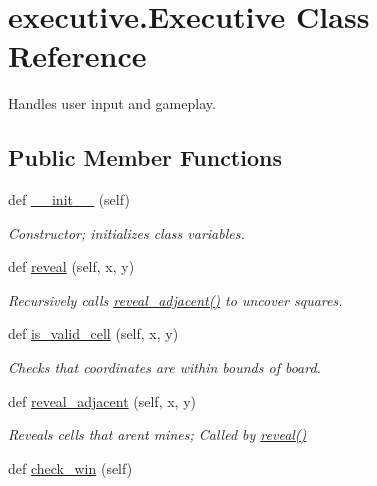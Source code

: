 \hypertarget{classexecutive_1_1_executive}{}\section{executive.\+Executive Class Reference}
\label{classexecutive_1_1_executive}


Handles user input and gameplay.  


\subsection*{Public Member Functions}
\begin{DoxyCompactItemize}
\item 
def \mbox{\hyperlink{classexecutive_1_1_executive_ac80ddb6446f931e0c83db8c38d55bd6f}{\+\_\+\+\_\+init\+\_\+\+\_\+}} (self)
\begin{DoxyCompactList}\small\item\em Constructor; initializes class variables. \end{DoxyCompactList}\item 
def \mbox{\hyperlink{classexecutive_1_1_executive_a6c8b73fd28d41e64cbd8b259d3c92ae8}{reveal}} (self, x, y)
\begin{DoxyCompactList}\small\item\em Recursively calls \mbox{\hyperlink{classexecutive_1_1_executive_a9d0ec27d177df404e872ffe9c2faf4ba}{reveal\+\_\+adjacent()}} to uncover squares. \end{DoxyCompactList}\item 
def \mbox{\hyperlink{classexecutive_1_1_executive_aa44d8e9965ea2e73d9e22c81208b8819}{is\+\_\+valid\+\_\+cell}} (self, x, y)
\begin{DoxyCompactList}\small\item\em Checks that coordinates are within bounds of board. \end{DoxyCompactList}\item 
def \mbox{\hyperlink{classexecutive_1_1_executive_a9d0ec27d177df404e872ffe9c2faf4ba}{reveal\+\_\+adjacent}} (self, x, y)
\begin{DoxyCompactList}\small\item\em Reveals cells that aren\textquotesingle{}t mines; Called by \mbox{\hyperlink{classexecutive_1_1_executive_a6c8b73fd28d41e64cbd8b259d3c92ae8}{reveal()}} \end{DoxyCompactList}\item 
def \mbox{\hyperlink{classexecutive_1_1_executive_a79dbdc41718e33faf8cc4a982ed40a32}{check\+\_\+win}} (self)

\end{DoxyCompactItemize}
